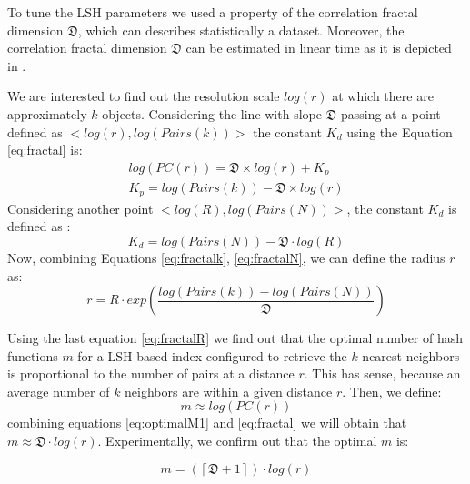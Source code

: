 \documentclass{article}
\begin{document}
To tune the LSH parameters we used  a property of the   correlation fractal dimension $\mathfrak{D}$, which can  describes statistically a dataset.  Moreover, the correlation fractal dimension $\mathfrak{D}$ can be estimated in linear time as it is depicted in \cite{traina2010fast}.

We are interested to find out  the resolution scale $log(r)$ at which there are approximately $k$ objects.  Considering the line with slope $\mathfrak{D}$ passing at  a point defined as $  <log (r), log (Pairs(k))>$  the   constant $K_d$ using the Equation \ref{eq:fractal} is:
\begin{eqnarray}\label{eq:fractalk}
       log(PC(r)) = \mathfrak{D} \times log (r) + K_p \nonumber\\
       K_p   = log (Pairs (k)) - \mathfrak{D} \times log (r)
\end{eqnarray}
Considering  another point   $  <log (R), log (Pairs(N))>$, the   constant $K_d$  is defined as :
\begin{equation}\label{eq:fractalN}
    K_d    = log (Pairs(N)) - \mathfrak{D} \cdot log (R)
\end{equation}
Now, combining Equations \ref{eq:fractalk}, \ref{eq:fractalN}, we can define  the radius  $r$ as:
\begin{equation}\label{eq:fractalR}
  r  =  R \cdot  exp (  \frac{log (Pairs (k)) - log (Pairs(N))}{ \mathfrak{D} } )
\end{equation}

 Using the last equation \ref{eq:fractalR} we find out that the optimal number of hash functions $m$  for a \acf{LSH} based index configured to retrieve the $k$ nearest neighbors is proportional to the number of pairs at a distance $r$. This has sense, because an average number of $k$ neighbors  are within a given distance $r$.  Then, we define:
\begin{equation}\label{eq:optimalM1}
   m \approx log (PC(r))
\end{equation}
 combining  equations \ref{eq:optimalM1} and \ref{eq:fractal} we will obtain that $m \approx \mathfrak{D} \cdot log (r)  $. Experimentally, we confirm out that the optimal  $m$ is:

 \begin{equation}\label{eq:fractalm}
    m = (\left\lceil \mathfrak{D} + 1 \right\rceil  ) \cdot  log (r)
 \end{equation}


\end{document}
